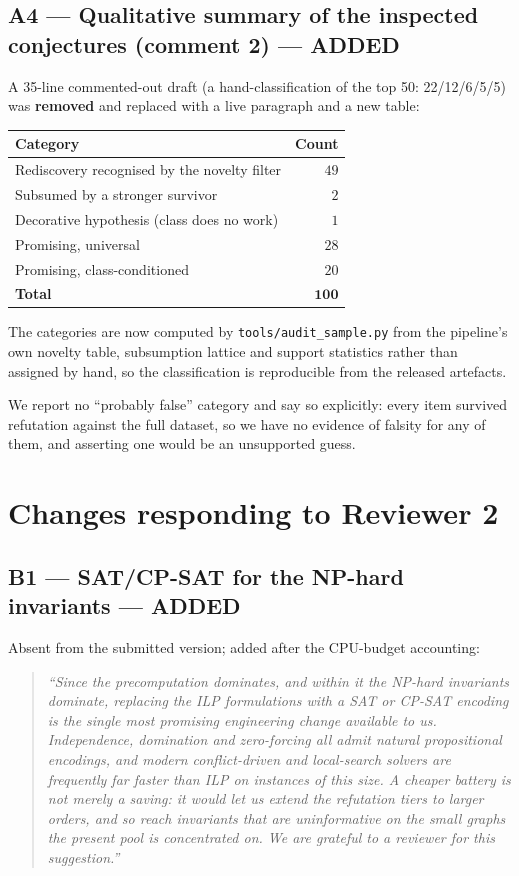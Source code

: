 \documentclass[11pt,a4paper]{article}
\newenvironment{chg}{%
  \begin{quote}\small\color{black!80}\itshape}{\end{quote}}
\begin{document}
\subsection{A4 --- Qualitative summary of the inspected conjectures (comment 2) --- ADDED}
A 35-line commented-out draft (a hand-classification of the top 50: 22/12/6/5/5)
was \textbf{removed} and replaced with a live paragraph and a new table:

\begin{center}\small
\begin{tabular}{lr}
\toprule
Category & Count \\
\midrule
Rediscovery recognised by the novelty filter & $49$ \\
Subsumed by a stronger survivor & $2$ \\
Decorative hypothesis (class does no work) & $1$ \\
Promising, universal & $28$ \\
Promising, class-conditioned & $20$ \\
\midrule
\textbf{Total} & $\mathbf{100}$ \\
\bottomrule
\end{tabular}
\end{center}

The categories are now computed by \texttt{tools/audit\_sample.py} from the
pipeline's own novelty table, subsumption lattice and support statistics rather
than assigned by hand, so the classification is reproducible from the released
artefacts.

We report no ``probably false'' category and say so explicitly: every item
survived refutation against the full dataset, so we have no evidence of falsity
for any of them, and asserting one would be an unsupported guess.

\section{Changes responding to Reviewer 2}

\subsection{B1 --- SAT/CP-SAT for the NP-hard invariants --- ADDED}
Absent from the submitted version; added after the CPU-budget accounting:
\begin{chg}
``Since the precomputation dominates, and within it the NP-hard invariants
dominate, replacing the ILP formulations with a SAT or CP-SAT encoding is the
single most promising engineering change available to us. Independence,
domination and zero-forcing all admit natural propositional encodings, and
modern conflict-driven and local-search solvers are frequently far faster than
ILP on instances of this size. A cheaper battery is not merely a saving: it
would let us extend the refutation tiers to larger orders, and so reach
invariants that are uninformative on the small graphs the present pool is
concentrated on. We are grateful to a reviewer for this suggestion.''
\end{chg}
\end{document}

